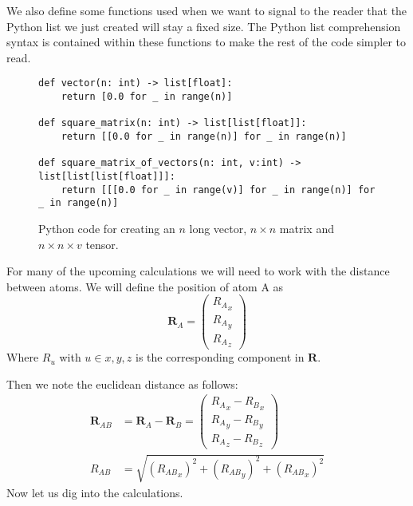 We also define some functions used when we want to signal to the reader that the Python list we just created will stay a fixed size. The Python list comprehension syntax is contained within these functions to make the rest of the code simpler to read.

\begin{figure}[H]
\begin{verbatim}
def vector(n: int) -> list[float]:
    return [0.0 for _ in range(n)]

def square_matrix(n: int) -> list[list[float]]:
    return [[0.0 for _ in range(n)] for _ in range(n)]

def square_matrix_of_vectors(n: int, v:int) -> list[list[list[float]]]:
    return [[[0.0 for _ in range(v)] for _ in range(n)] for _ in range(n)]
\end{verbatim}
    \caption{Python code for creating an $n$ long vector, $n\times n$ matrix and $n\times n \times v$ tensor.}
\end{figure}

For many of the upcoming calculations we will need to work with the distance between atoms. We will define the position of atom A as
\begin{equation}
\pmb{R}_A=
    \begin{pmatrix}
    {R_A}_x\\
    {R_A}_y\\{R_A}_z
    \end{pmatrix}
\end{equation}
Where $R_u$ with $u\in x,y,z$ is the corresponding component in $\pmb{R}$.

Then we note the euclidean distance as follows:
\begin{align}
    \pmb{R}_{AB} &= \pmb{R}_A-\pmb{R}_B=
    \begin{pmatrix}
    {R_A}_x-{R_B}_x\\
    {R_A}_y-{R_B}_y\\
    {R_A}_z-{R_B}_z
    \end{pmatrix}
\\
    R_{AB} &= \sqrt{({R_{AB}}_x)^2+({R_{AB}}_y)^2+({R_{AB}}_x)^2}
\end{align}
Now let us dig into the calculations. 
